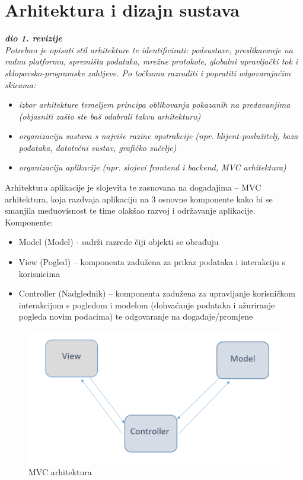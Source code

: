 \chapter{Arhitektura i dizajn sustava}
		
		\textbf{\textit{dio 1. revizije}}\\

		\textit{ Potrebno je opisati stil arhitekture te identificirati: podsustave, preslikavanje na radnu platformu, spremišta podataka, mrežne protokole, globalni upravljački tok i sklopovsko-programske zahtjeve. Po točkama razraditi i popratiti odgovarajućim skicama:}
	\begin{itemize}
		\item 	\textit{izbor arhitekture temeljem principa oblikovanja pokazanih na predavanjima (objasniti zašto ste baš odabrali takvu arhitekturu)}
		\item 	\textit{organizaciju sustava s najviše razine apstrakcije (npr. klijent-poslužitelj, baza podataka, datotečni sustav, grafičko sučelje)}
		\item 	\textit{organizaciju aplikacije (npr. slojevi frontend i backend, MVC arhitektura) }		
	\end{itemize}
	
	\noindent Arhitektura aplikacije je slojevita te zasnovana na događajima – MVC arhitektura, koja razdvaja aplikaciju na 3 osnovne komponente kako bi se smanjila međuovisnost te time olakšao razvoj i održavanje aplikacije. Komponente:
	
		\begin{itemize}
		\item Model (Model) - sadrži razrede čiji objekti se obrađuju
		\item View (Pogled) – komponenta zadužena za prikaz podataka i interakciju s korisnicima
		\item Controller (Nadglednik) – komponenta zadužena za upravljanje korisničkom interakcijom s pogledom i modelom (dohvaćanje podataka i ažuriranje pogleda novim podacima) te odgovaranje na događaje/promjene
		\end{itemize}
		
			\begin{figure}[H]
			\includegraphics[scale=0.45]{slike/MVC.PNG} %
			\centering
			\caption{MVC arhitektura}
			\label{fig:mvc} %
		\end{figure}

